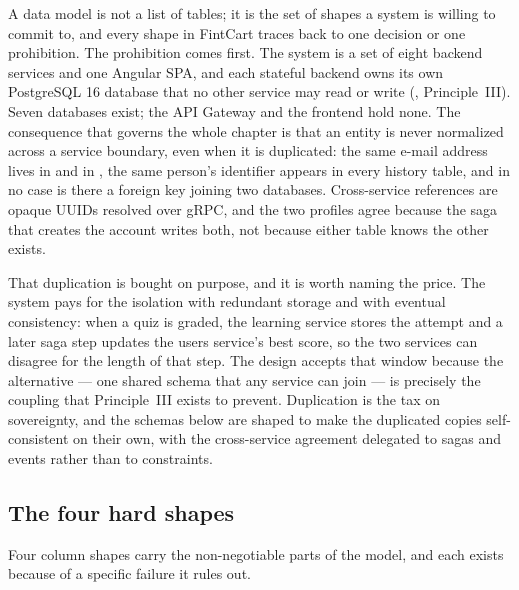 A data model is not a list of tables; it is the set of shapes a system is
willing to commit to, and every shape in FintCart traces back to one decision or
one prohibition. The prohibition comes first. The system is a set of eight
backend services and one Angular SPA, and each stateful backend owns its own
PostgreSQL 16 database that no other service may read or write
(, Principle~III). Seven databases
exist; the API Gateway and the frontend hold none. The consequence that governs
the whole chapter is that an entity is never normalized across a service
boundary, even when it is duplicated: the same e-mail address lives in
 and in , the same person's
identifier appears in every history table, and in no case is there a foreign key
joining two databases. Cross-service references are opaque UUIDs resolved over
gRPC, and the two profiles agree because the saga that creates the account
writes both, not because either table knows the other exists.

That duplication is bought on purpose, and it is worth naming the price. The
system pays for the isolation with redundant storage and with eventual
consistency: when a quiz is graded, the learning service stores the attempt and
a later saga step updates the users service's best score, so the two services
can disagree for the length of that step. The design accepts that window because
the alternative --- one shared schema that any service can join --- is precisely
the coupling that Principle~III exists to prevent. Duplication is the tax on
sovereignty, and the schemas below are shaped to make the duplicated copies
self-consistent on their own, with the cross-service agreement delegated to
sagas and events rather than to constraints.

\subsection{The four hard shapes}

Four column shapes carry the non-negotiable parts of the model, and each exists
because of a specific failure it rules out.

